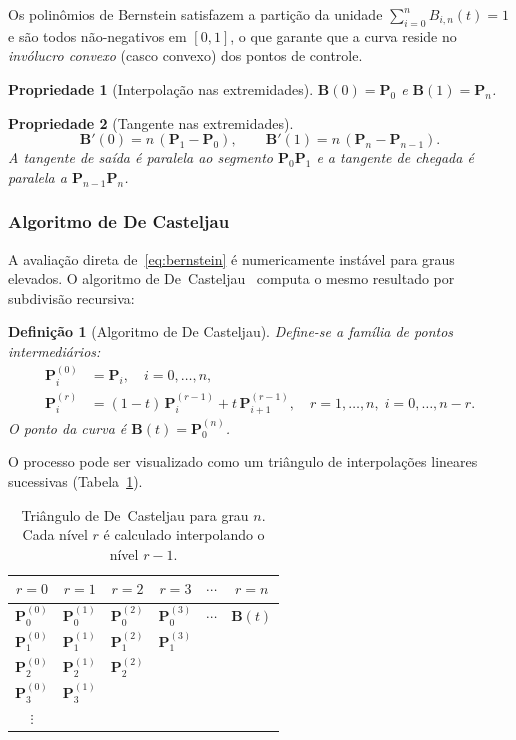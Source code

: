 \documentclass[12pt, a4paper]{article}
\newtheorem{prop}{Propriedade}[section]
\newtheorem{defn}{Definição}[section]
\theoremstyle{remark}
\begin{document}
Os polinômios de Bernstein satisfazem a partição da unidade
$\sum_{i=0}^n B_{i,n}(t) = 1$ e são todos não-negativos em $[0,1]$, o que
garante que a curva reside no \emph{invólucro convexo} (casco convexo)
dos pontos de controle.

\begin{prop}[Interpolação nas extremidades]
$\mathbf{B}(0) = \mathbf{P}_0$ e $\mathbf{B}(1) = \mathbf{P}_n$.
\end{prop}

\begin{prop}[Tangente nas extremidades]
\[
    \mathbf{B}'(0) = n\,(\mathbf{P}_1 - \mathbf{P}_0), \qquad
    \mathbf{B}'(1) = n\,(\mathbf{P}_n - \mathbf{P}_{n-1}).
\]
A tangente de saída é paralela ao segmento $\mathbf{P}_0\mathbf{P}_1$
e a tangente de chegada é paralela a $\mathbf{P}_{n-1}\mathbf{P}_n$.
\end{prop}

\subsubsection{Algoritmo de De Casteljau}

A avaliação direta de~\eqref{eq:bernstein} é numericamente instável para graus
elevados. O algoritmo de De~Casteljau~\cite{decasteljau1959} computa o mesmo
resultado por subdivisão recursiva:

\begin{defn}[Algoritmo de De Casteljau]
Define-se a família de pontos intermediários:
\begin{align}
    \mathbf{P}_i^{(0)} &= \mathbf{P}_i, \quad i = 0, \ldots, n, \\[4pt]
    \mathbf{P}_i^{(r)} &= (1-t)\,\mathbf{P}_i^{(r-1)}
                        + t\,\mathbf{P}_{i+1}^{(r-1)},
    \quad r = 1, \ldots, n, \; i = 0, \ldots, n-r.
\end{align}
O ponto da curva é $\mathbf{B}(t) = \mathbf{P}_0^{(n)}$.
\end{defn}

O processo pode ser visualizado como um triângulo de interpolações lineares
sucessivas (Tabela~\ref{tab:decasteljau}).

\begin{table}[H]
\centering
\begin{tabular}{cccccc}
\toprule
$r=0$ & $r=1$ & $r=2$ & $r=3$ & $\cdots$ & $r=n$ \\
\midrule
$\mathbf{P}_0^{(0)}$ & $\mathbf{P}_0^{(1)}$ & $\mathbf{P}_0^{(2)}$ & $\mathbf{P}_0^{(3)}$ & $\cdots$ & $\mathbf{B}(t)$ \\
$\mathbf{P}_1^{(0)}$ & $\mathbf{P}_1^{(1)}$ & $\mathbf{P}_1^{(2)}$ & $\mathbf{P}_1^{(3)}$ & & \\
$\mathbf{P}_2^{(0)}$ & $\mathbf{P}_2^{(1)}$ & $\mathbf{P}_2^{(2)}$ & & & \\
$\mathbf{P}_3^{(0)}$ & $\mathbf{P}_3^{(1)}$ & & & & \\
$\vdots$ & & & & & \\
\bottomrule
\end{tabular}
\caption{Triângulo de De~Casteljau para grau $n$. Cada nível $r$ é calculado
         interpolando o nível $r-1$.}
\label{tab:decasteljau}
\end{table}
\end{document}
